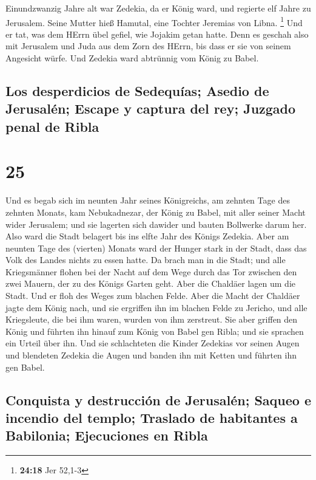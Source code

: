  Einundzwanzig Jahre alt war Zedekia, da er König ward,
und regierte elf Jahre zu Jerusalem. Seine Mutter hieß Hamutal, eine
Tochter Jeremias von Libna. \footnote{\textbf{24:18} Jer 52,1-3}
 Und er tat, was dem HErrn übel gefiel, wie Jojakim getan
hatte.  Denn es geschah also mit Jerusalem und Juda aus
dem Zorn des HErrn, bis dass er sie von seinem Angesicht würfe. Und
Zedekia ward abtrünnig vom König zu Babel.

\hypertarget{los-desperdicios-de-sedequuxedas-asedio-de-jerusaluxe9n-escape-y-captura-del-rey-juzgado-penal-de-ribla}{%
\subsection{Los desperdicios de Sedequías; Asedio de Jerusalén; Escape y
captura del rey; Juzgado penal de
Ribla}\label{los-desperdicios-de-sedequuxedas-asedio-de-jerusaluxe9n-escape-y-captura-del-rey-juzgado-penal-de-ribla}}

\hypertarget{section-24}{%
\section{25}\label{section-24}}

 Und es begab sich im neunten Jahr seines Königreichs, am
zehnten Tage des zehnten Monats, kam Nebukadnezar, der König zu Babel,
mit aller seiner Macht wider Jerusalem; und sie lagerten sich dawider
und bauten Bollwerke darum her.  Also ward die Stadt
belagert bis ins elfte Jahr des Königs Zedekia.  Aber am
neunten Tage des (vierten) Monats ward der Hunger stark in der Stadt,
dass das Volk des Landes nichts zu essen hatte.  Da brach
man in die Stadt; und alle Kriegsmänner flohen bei der Nacht auf dem
Wege durch das Tor zwischen den zwei Mauern, der zu des Königs Garten
geht. Aber die Chaldäer lagen um die Stadt. Und er floh des Weges zum
blachen Felde.  Aber die Macht der Chaldäer jagte dem
König nach, und sie ergriffen ihn im blachen Felde zu Jericho, und alle
Kriegsleute, die bei ihm waren, wurden von ihm zerstreut. 
Sie aber griffen den König und führten ihn hinauf zum König von Babel
gen Ribla; und sie sprachen ein Urteil über ihn.  Und sie
schlachteten die Kinder Zedekias vor seinen Augen und blendeten Zedekia
die Augen und banden ihn mit Ketten und führten ihn gen Babel.

\hypertarget{conquista-y-destrucciuxf3n-de-jerusaluxe9n-saqueo-e-incendio-del-templo-traslado-de-habitantes-a-babilonia-ejecuciones-en-ribla}{%
\subsection{Conquista y destrucción de Jerusalén; Saqueo e incendio del
templo; Traslado de habitantes a Babilonia; Ejecuciones en
Ribla}\label{conquista-y-destrucciuxf3n-de-jerusaluxe9n-saqueo-e-incendio-del-templo-traslado-de-habitantes-a-babilonia-ejecuciones-en-ribla}}

